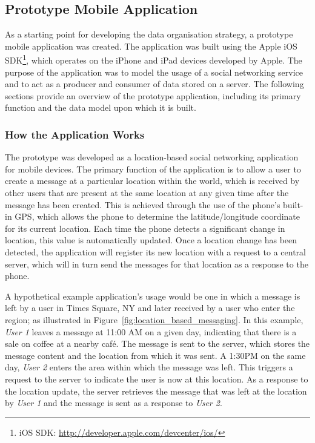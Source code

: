 \documentclass{article}
\begin{document}
\subsection{Prototype Mobile Application} %
\label{sub:prototype_mobile_application}

As a starting point for developing the data organisation strategy, a prototype mobile application was created. The application was built using the Apple iOS SDK\footnote{iOS SDK: \url{http://developer.apple.com/devcenter/ios/}}, which operates on the iPhone and iPad devices developed by Apple. The purpose of the application was to model the usage of a social networking service and to act as a producer and consumer of data stored on a server. The following sections provide an overview of the prototype application, including its primary function and the data model upon which it is built.

\subsubsection{How the Application Works} %
\label{ssub:how_the_application_works}

The prototype was developed as a location-based social networking application for mobile devices. The primary function of the application is to allow a user to create a message at a particular location within the world, which is received by other users that are present at the same location at any given time after the message has been created. This is achieved through the use of the phone's built-in GPS, which allows the phone to determine the latitude/longitude coordinate for its current location. Each time the phone detects a significant change in location, this value is automatically updated. Once a location change has been detected, the application will register its new location with a request to a central server, which will in turn send the messages for that location as a response to the phone.

A hypothetical example application's usage would be one in which a message is left by a user in Times Square, NY and later received by a user who enter the region; as illustrated in Figure~\ref{fig:location_based_messaging}. In this example, \emph{User 1} leaves a message at 11:00 AM on a given day, indicating that there is a sale on coffee at a nearby caf\'e. The message is sent to the server, which stores the message content and the location from which it was sent. A 1:30PM on the same day, \emph{User 2} enters the area within which the message was left. This triggers a request to the server to indicate the user is now at this location. As a response to the location update, the server retrieves the message that was left at the location by \emph{User 1} and the message is sent as a response to \emph{User 2}.
\end{document}
